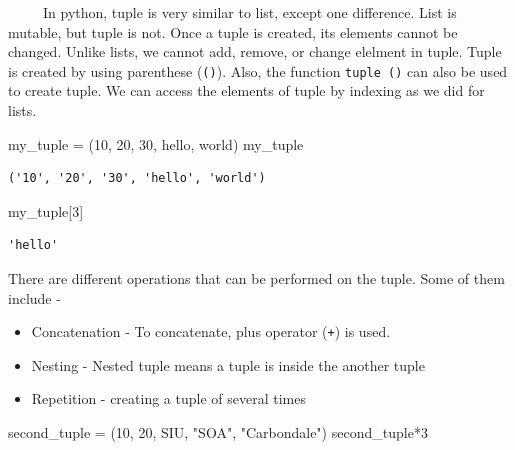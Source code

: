 \documentclass[
  letterpaper,
  DIV=11,
  numbers=noendperiod]{scrreprt}
\newenvironment{Shaded}{\begin{snugshade}}{\end{snugshade}}
\newcommand{\DecValTok}[1]{\textcolor[rgb]{0.68,0.00,0.00}{#1}}
\newcommand{\NormalTok}[1]{\textcolor[rgb]{0.00,0.23,0.31}{#1}}
\newcommand{\OperatorTok}[1]{\textcolor[rgb]{0.37,0.37,0.37}{#1}}
\newcommand{\StringTok}[1]{\textcolor[rgb]{0.13,0.47,0.30}{#1}}
\begin{document}
~~~~~In python, tuple is very similar to list, except one difference.
List is mutable, but tuple is not. Once a tuple is created, its elements
cannot be changed. Unlike lists, we cannot add, remove, or change
elelment in tuple. Tuple is created by using parenthese (\texttt{()}).
Also, the function \texttt{tuple\ ()} can also be used to create tuple.
We can access the elements of tuple by indexing as we did for lists.

\begin{Shaded}
\begin{Highlighting}[]
\NormalTok{my\_tuple }\OperatorTok{=}\NormalTok{ (}\StringTok{\textquotesingle{}10\textquotesingle{}}\NormalTok{, }\StringTok{\textquotesingle{}20\textquotesingle{}}\NormalTok{, }\StringTok{\textquotesingle{}30\textquotesingle{}}\NormalTok{, }\StringTok{\textquotesingle{}hello\textquotesingle{}}\NormalTok{, }\StringTok{\textquotesingle{}world\textquotesingle{}}\NormalTok{)}
\NormalTok{my\_tuple}
\end{Highlighting}
\end{Shaded}

\begin{verbatim}
('10', '20', '30', 'hello', 'world')
\end{verbatim}

\begin{Shaded}
\begin{Highlighting}[]
\NormalTok{my\_tuple[}\DecValTok{3}\NormalTok{]}
\end{Highlighting}
\end{Shaded}

\begin{verbatim}
'hello'
\end{verbatim}

There are different operations that can be performed on the tuple. Some
of them include -

\begin{itemize}
\item
  Concatenation - To concatenate, plus operator (\texttt{+}) is used.
\item
  Nesting - Nested tuple means a tuple is inside the another tuple
\item
  Repetition - creating a tuple of several times
\end{itemize}

\begin{Shaded}
\begin{Highlighting}[]
\NormalTok{second\_tuple }\OperatorTok{=}\NormalTok{ (}\StringTok{\textquotesingle{}10\textquotesingle{}}\NormalTok{, }\StringTok{\textquotesingle{}20\textquotesingle{}}\NormalTok{, }\StringTok{\textquotesingle{}SIU\textquotesingle{}}\NormalTok{, }\StringTok{"SOA"}\NormalTok{, }\StringTok{"Carbondale"}\NormalTok{)}
\NormalTok{second\_tuple}\OperatorTok{*}\DecValTok{3}
\end{Highlighting}
\end{Shaded}
\end{document}
